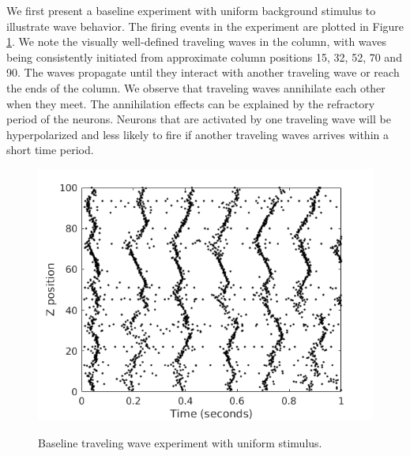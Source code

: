 \documentclass[a4paper,11pt]{article}
\begin{document}
We first present a baseline experiment with uniform background stimulus to illustrate wave behavior. 
The firing events in the experiment are plotted in Figure \ref{fig:baseline}.
We note the visually well-defined traveling waves in the column, with waves being consistently initiated from approximate column positions 15, 32, 52, 70 and 90.
The waves propagate until they interact with another traveling wave or reach the ends of the column.
We observe that traveling waves annihilate each other when they meet.
The annihilation effects can be explained by the refractory period of the neurons.
Neurons that are activated by one traveling wave will be hyperpolarized and less likely to fire if another traveling waves arrives within a short time period.
\begin{figure}[!ht]
 \centering
 \caption{Baseline traveling wave experiment with uniform stimulus.}
 \includegraphics[width=\textwidth]{fig/baseline}
 \label{fig:baseline}
\end{figure}
\end{document}
